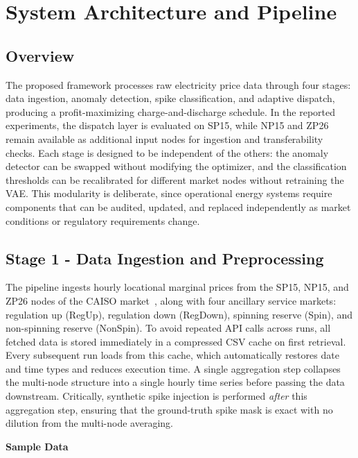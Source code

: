 \documentclass[journal]{IEEEtran}
\begin{document}
\section{System Architecture and Pipeline}
\label{sec:pipeline}

\subsection{Overview}
The proposed framework processes raw electricity price data through four stages: data ingestion, anomaly detection, spike classification, and adaptive dispatch, producing a profit-maximizing charge-and-discharge schedule. In the reported experiments, the dispatch layer is evaluated on SP15, while NP15 and ZP26 remain available as additional input nodes for ingestion and transferability checks. Each stage is designed to be independent of the others: the anomaly detector can be swapped without modifying the optimizer, and the classification thresholds can be recalibrated for different market nodes without retraining the VAE. This modularity is deliberate, since operational energy systems require components that can be audited, updated, and replaced independently as market conditions or regulatory requirements change.

\subsection{Stage 1 - Data Ingestion and Preprocessing}
The pipeline ingests hourly locational marginal prices from the SP15, NP15, and ZP26 nodes of the CAISO market~\cite{CAISO}, along with four ancillary service markets: regulation up (RegUp), regulation down (RegDown), spinning reserve (Spin), and non-spinning reserve (NonSpin). To avoid repeated API calls across runs, all fetched data is stored immediately in a compressed CSV cache on first retrieval. Every subsequent run loads from this cache, which automatically restores date and time types and reduces execution time. A single aggregation step collapses the multi-node structure into a single hourly time series before passing the data downstream. Critically, synthetic spike injection is performed \emph{after} this aggregation step, ensuring that the ground-truth spike mask is exact with no dilution from the multi-node averaging.

\noindent\textbf{Sample Data}
\end{document}
